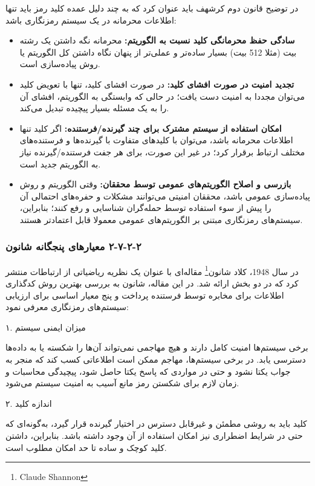 در توضیح قانون دوم کرشهف باید عنوان کرد که به چند دلیل عمده کلید رمز باید تنها اطلاعات محرمانه در یک سیستم رمزنگاری باشد:

\begin{itemize}
    \item \textbf{سادگی حفظ محرمانگی کلید نسبت به الگوریتم:} محرمانه نگه داشتن یک رشته بیت (مثلا 512 بیت) بسیار ساده‌تر و عملی‌تر از پنهان نگاه داشتن کل الگوریتم یا روش پیاده‌سازی است.
    \item \textbf{تجدید امنیت در صورت افشای کلید:} در صورت افشای کلید، تنها با تعویض کلید می‌توان مجددا به امنیت دست یافت؛ در حالی که وابستگی به الگوریتم، افشای آن را به یک مسئله بسیار پیچیده تبدیل می‌کند.
    \item \textbf{امکان استفاده از سیستم مشترک برای چند گیرنده/فرستنده:} اگر کلید تنها اطلاعات محرمانه باشد، می‌توان با کلیدهای متفاوت با گیرنده‌ها و فرستنده‌های مختلف ارتباط برقرار کرد؛ در غیر این صورت، برای هر جفت فرستنده/گیرنده نیاز به الگوریتم جدید است.
    \item \textbf{بازرسی و اصلاح الگوریتم‌های عمومی توسط محققان:} وقتی الگوریتم و روش پیاده‌سازی عمومی باشد، محققان امنیتی می‌توانند مشکلات و حفره‌های احتمالی آن را پیش از سوء استفاده توسط حمله‌گران شناسایی و رفع کنند؛ بنابراین، سیستم‌های رمزنگاری مبتنی بر الگوریتم‌های عمومی معمولا قابل اعتمادتر هستند\cite{ref36}.
\end{itemize}

\subsubsection{‏۲‏-‏۲‏-‏۷‏-‏۲‏ معیارهای پنجگانه شانون}

در سال 1948، کلاد شانون\footnote{Claude Shannon} مقاله‌ای با عنوان یک نظریه ریاضیاتی از ارتباطات منتشر کرد که در دو بخش ارائه شد. در این مقاله، شانون به بررسی بهترین روش کدگذاری اطلاعات برای مخابره توسط فرستنده پرداخت و پنج معیار اساسی برای ارزیابی سیستم‌های رمزنگاری معرفی نمود\cite{ref37}:

۱. میزان ایمنی سیستم

برخی سیستم‌ها امنیت کامل دارند و هیچ مهاجمی نمی‌تواند آن‌ها را شکسته یا به داده‌ها دسترسی یابد. در برخی سیستم‌ها، مهاجم ممکن است اطلاعاتی کسب کند که منجر به جواب یکتا نشود و حتی در مواردی که پاسخ یکتا حاصل شود، پیچیدگی محاسبات و زمان لازم برای شکستن رمز مانع آسیب به امنیت سیستم می‌شود.

۲. اندازه کلید

کلید باید به روشی مطمئن و غیرقابل دسترس در اختیار گیرنده قرار گیرد، به‌گونه‌ای که حتی در شرایط اضطراری نیز امکان استفاده از آن وجود داشته باشد. بنابراین، داشتن کلید کوچک و ساده تا حد امکان مطلوب است.

